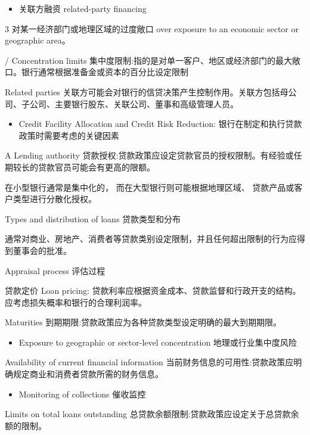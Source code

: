 \begin{itemize}
\item 关联方融资 related-party financing
\end{itemize}

3 对某一经济部门或地理区域的过度敞口 over exposure to an economic sector or geographic area。

/ Concentration limits 集中度限制:指的是对单一客户、地区或经济部门的最大敞口。银行通常根据准备金或资本的百分比设定限制

 Related parties 关联方可能会对银行的信贷决策产生控制作用。关联方包括母公司、子公司、主要银行股东、关联公司、董事和高级管理人员。

\begin{itemize}
\item Credit Facility Allocation and Credit Risk Reduction: 银行在制定和执行贷款政策时需要考虑的关键因素
\end{itemize}

A Lending authority 贷款授权:贷款政策应设定贷款官员的授权限制。有经验或任期较长的贷款官员可能会有更高的限额。

在小型银行通常是集中化的， 而在大型银行则可能根据地理区域、 贷款产品或客户类型进行分散化授权。

Types and distribution of loans 贷款类型和分布

通常对商业、房地产、消费者等贷款类别设定限制，并且任何超出限制的行为应得到董事会的批准。

Appraisal process 评估过程

 贷款定价 Loan pricing: 贷款利率应根据资金成本、贷款监督和行政开支的结构。应考虑损失概率和银行的合理利润率。

 Maturities 到期期限:贷款政策应为各种贷款类型设定明确的最大到期期限。

\begin{itemize}
\item Exposure to geographic or sector-level concentration 地理或行业集中度风险
\end{itemize}

 Availability of current financial information 当前财务信息的可用性:贷款政策应明确规定商业和消费者贷款所需的财务信息。

\begin{itemize}
\item Monitoring of collections 催收监控
\end{itemize}

 Limits on total loans outstanding 总贷款余额限制:贷款政策应设定关于总贷款余额的限制。

